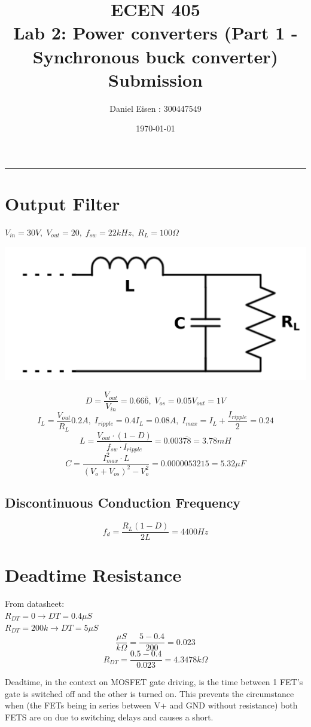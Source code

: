 \documentclass[11pt]{article}
\title{ECEN 405 \\ Lab 2: Power converters (Part 1 - Synchronous buck converter) Submission}
\author{Daniel Eisen : 300447549}
\date{\today}
\begin{document}
\begin{preview}

      \maketitle
      \hrule
      \section{Output Filter}
      $V_{in}=30V,\; V_{out}=20,\; f_{sw}=22kHz,\; R_{L}=100\Omega$
            \begin{center}
                  \includegraphics[height=0.2\textwidth]{img/filter.png}
            \end{center}
            $$D=\frac{V_{out}}{V_{in}} = 0.66\bar{6}, \; V_{os}=0.05V_{out}=1V$$
            $$I_{L}=\frac{V_{out}}{R_{L}}0.2A, \; I_{ripple}=0.4I_{L} = 0.08A, \; I_{max}=I_{L}+\frac{I_{ripple}}{2} = 0.24$$
            $$L=\frac{V_{out}\cdot\left(1-D\right)}{f_{sw}\cdot I_{ripple}}=0.003\bar{78}=3.78mH$$
            $$C=\frac{I_{max}^{2}\cdot L}{\left(V_{o}+V_{os}\right)^{2}-V_{o}^{2}}=0.0000053215=5.32\mu F$$
      \subsection{Discontinuous Conduction Frequency}
            $$f_{d}=\frac{R_{L}\left(1-D\right)}{2L} = 4400Hz$$
      \section{Deadtime Resistance}
            From datasheet: \\
            $R_{DT}=0 \rightarrow DT=0.4\mu S$ \\
            $R_{DT}=200k \rightarrow DT=5\mu S$
            $$\frac{\mu S}{k\Omega} = \frac{5-0.4}{200} = 0.023$$
            $$R_{DT} = \frac{0.5-0.4}{0.023} = 4.3478k\Omega$$

            Deadtime, in the context on MOSFET gate driving, is the time between 1 FET's gate is switched off and the other is turned on. This prevents the circumstance when (the FETs being in series between V+ and GND without resistance) both FETS are on due to switching delays and causes a short. 

\end{preview}
\end{document}
